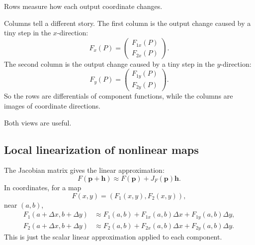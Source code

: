 Rows measure how each output coordinate changes.

Columns tell a different story.  The first column is the output change caused by a tiny
step in the \(x\)-direction:
\[
    F_x(P)=
    \begin{pmatrix}
        F_{1x}(P)\\
        F_{2x}(P)
    \end{pmatrix}.
\]
The second column is the output change caused by a tiny step in the \(y\)-direction:
\[
    F_y(P)=
    \begin{pmatrix}
        F_{1y}(P)\\
        F_{2y}(P)
    \end{pmatrix}.
\]
So the rows are differentials of component functions, while the columns are images of
coordinate directions.

Both views are useful.

\subsection{Local linearization of nonlinear maps}

The Jacobian matrix gives the linear approximation:
\[
\boxed{
    F(\mathbf p+\mathbf h)
    \approx
    F(\mathbf p)+J_F(\mathbf p)\mathbf h.
}
\]
In coordinates, for a map
\[
    F(x,y)=(F_1(x,y),F_2(x,y)),
\]
near \((a,b)\),
\[
\boxed{
\begin{aligned}
F_1(a+\Delta x,b+\Delta y)
&\approx
F_1(a,b)
+
F_{1x}(a,b)\Delta x
+
F_{1y}(a,b)\Delta y,\\
F_2(a+\Delta x,b+\Delta y)
&\approx
F_2(a,b)
+
F_{2x}(a,b)\Delta x
+
F_{2y}(a,b)\Delta y.
\end{aligned}
}
\]
This is just the scalar linear approximation applied to each component.

